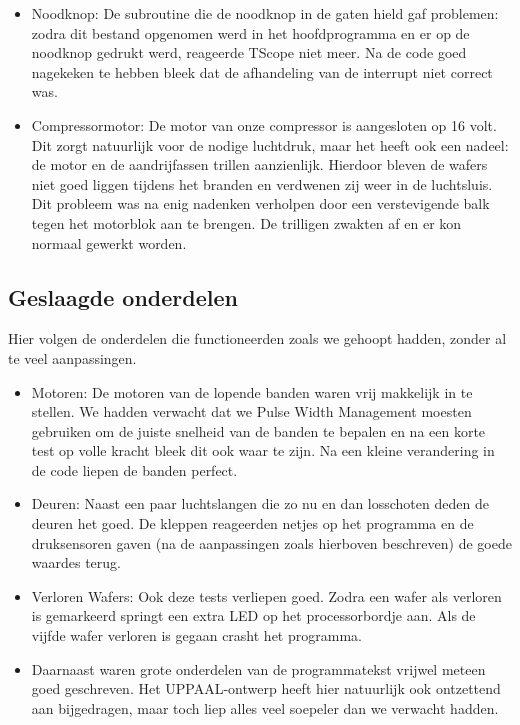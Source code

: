 \begin{itemize}
    \item Noodknop: De subroutine die de noodknop in de gaten hield gaf problemen: zodra dit bestand opgenomen werd in het hoofdprogramma en er op de noodknop gedrukt werd, reageerde TScope niet meer. Na de code goed nagekeken te hebben bleek dat de afhandeling van de interrupt niet correct was. 
    \item Compressormotor: De motor van onze compressor is aangesloten op 16 volt. Dit zorgt natuurlijk voor de nodige luchtdruk, maar het heeft ook een nadeel: de motor en de aandrijfassen trillen aanzienlijk. Hierdoor bleven de wafers niet goed liggen tijdens het branden en verdwenen zij weer in de luchtsluis. Dit probleem was na enig nadenken verholpen door een verstevigende balk tegen het motorblok aan te brengen. De trilligen zwakten af en er kon normaal gewerkt worden.
\end{itemize}

\subsection{Geslaagde onderdelen}
Hier volgen de onderdelen die functioneerden zoals we gehoopt hadden, zonder al te veel aanpassingen.

\begin{itemize}
    \item Motoren: De motoren van de lopende banden waren vrij makkelijk in te stellen. We hadden verwacht dat we Pulse Width Management moesten gebruiken om de juiste snelheid van de banden te bepalen en na een korte test op volle kracht bleek dit ook waar te zijn. Na een kleine verandering in de code liepen de banden perfect.
    \item Deuren: Naast een paar luchtslangen die zo nu en dan losschoten deden de deuren het goed. De kleppen reageerden netjes op het programma en de druksensoren gaven (na de aanpassingen zoals hierboven beschreven) de goede waardes terug.
    \item Verloren Wafers: Ook deze tests verliepen goed. Zodra een wafer als verloren is gemarkeerd springt een extra LED op het processorbordje aan. Als de vijfde wafer verloren is gegaan crasht het programma.
    \item Daarnaast waren grote onderdelen van de programmatekst vrijwel meteen goed geschreven. Het UPPAAL-ontwerp heeft hier natuurlijk ook ontzettend aan bijgedragen, maar toch liep alles veel soepeler dan we verwacht hadden.
\end{itemize}